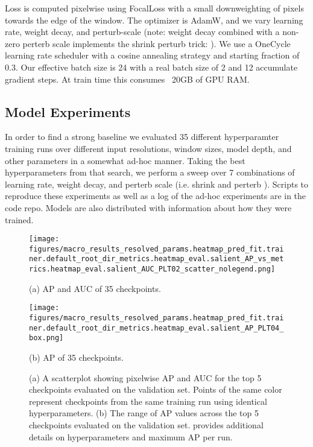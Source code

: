 \documentclass[10pt,twocolumn,letterpaper]{article}
\begin{document}
Loss is computed pixelwise using FocalLoss \cite{ross2017focal} with a small
downweighting of pixels towards the edge of the window.  The optimizer is
AdamW, and we vary learning rate, weight decay, and perturb-scale (note: weight
decay combined with a non-zero perterb scale implements the shrink perturb
trick: \cite{ash_warm_starting_2020}).  We use a OneCycle learning rate
scheduler with a cosine annealing strategy and starting fraction of 0.3.  Our
effective batch size is 24 with a real batch size of 2 and 12 accumulate
gradient steps. At train time this consumes ~20GB of GPU RAM.


\subsection{Model Experiments}

In order to find a strong baseline we evaluated 35 different hyperparamter
training runs over different input resolutions, window sizes, model depth, and
other parameters in a somewhat ad-hoc manner. Taking the best hyperparameters
from that search, we perform a sweep over 7 combinations of learning rate,
weight decay, and perterb scale (i.e. shrink and perterb
\cite{ash_warm_starting_2020}). Scripts to reproduce these experiments as well
as a log of the ad-hoc experiments are in the code repo.
Models are also distributed with information about how they were trained.


\begin{figure}[ht]
\centering

\texttt{[image: figures/macro\_results\_resolved\_params.heatmap\_pred\_fit.trainer.default\_root\_dir\_metrics.heatmap\_eval.salient\_AP\_vs\_metrics.heatmap\_eval.salient\_AUC\_PLT02\_scatter\_nolegend.png]}

(a) AP and AUC of 35 checkpoints.

\texttt{[image: figures/macro\_results\_resolved\_params.heatmap\_pred\_fit.trainer.default\_root\_dir\_metrics.heatmap\_eval.salient\_AP\_PLT04\_box.png]}

(b) AP of 35 checkpoints.

\caption[]{
    (a) A scatterplot showing pixelwise AP and AUC for the top 5 checkpoints
    evaluated on the validation set. Points of the same color represent
    checkpoints from the same training run using identical hyperparameters.
    (b) The range of AP values across the top 5 checkpoints evaluated on the
    validation set.  provides additional
    details on hyperparameters and maximum AP per run.
}
\label{fig:apauc_scatter}
\end{figure}
\end{document}
